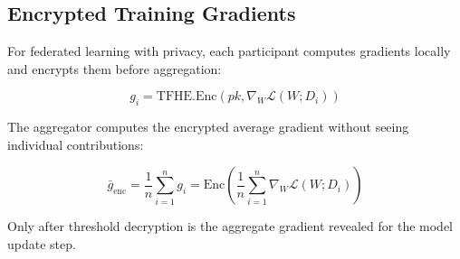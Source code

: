 \subsection{Encrypted Training Gradients}

For federated learning with privacy, each participant computes gradients locally and encrypts them before aggregation:

\begin{equation}
g_i = \text{TFHE.Enc}(pk, \nabla_W \mathcal{L}(W; D_i))
\end{equation}

The aggregator computes the encrypted average gradient without seeing individual contributions:

\begin{equation}
\bar{g}_{\text{enc}} = \frac{1}{n} \sum_{i=1}^n g_i = \text{Enc}\left(\frac{1}{n} \sum_{i=1}^n \nabla_W \mathcal{L}(W; D_i)\right)
\end{equation}

Only after threshold decryption is the aggregate gradient revealed for the model update step.

